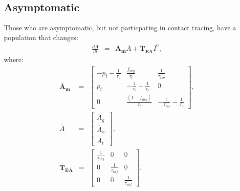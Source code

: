 \documentclass[notitlepage, superscriptaddress]{revtex4-2}
\begin{document}
\subsection{Asymptomatic}
Those who are asymptomatic, but not particpating in contact tracing, have a population that changes:
\begin{eqnarray}
\frac{d\bar{A}}{dt} &=& \boldsymbol{\bar{A}_{m}}  \bar{A} + \boldsymbol{\bar{T}_{\bar{E}\bar{A}}}  \bar{I}^{a}, 
\end{eqnarray}
where:
%
\begin{eqnarray}
\boldsymbol{\bar{A}_{m}} &=&
\begin{bmatrix}
- p_{t} -\frac{1}{\tau_{a}}  &  \frac{f_{neg}}{\tau_{t}}            & \frac{1}{\tau_{iso}} \\ 
 p_{t}              & -\frac{1}{\tau_{t}} -\frac{1}{\tau_{a}}       & 0  \\ 
 0                  & \frac{(1- f_{neg})}{\tau_{t}}                        & -\frac{1}{\tau_{iso}} -\frac{1}{\tau_{a}}
\end{bmatrix}, \\ 
%
\bar{A} &=& 
\begin{bmatrix}
\bar{A}_{g} \\ \bar{A}_{w}\\ \bar{A}_{t}
\end{bmatrix}, \\ 
%
\boldsymbol{\bar{T}_{\bar{E}\bar{A}}} &=&
\begin{bmatrix}
\frac{1}{\tau_{inf}}  & 0                 & 0 \\ 
 0          &  \frac{1}{\tau_{inf}}  & 0 \\ 
 0          & 0                 &  \frac{1}{\tau_{inf}} 
\end{bmatrix}.
%
\end{eqnarray}
\end{document}
